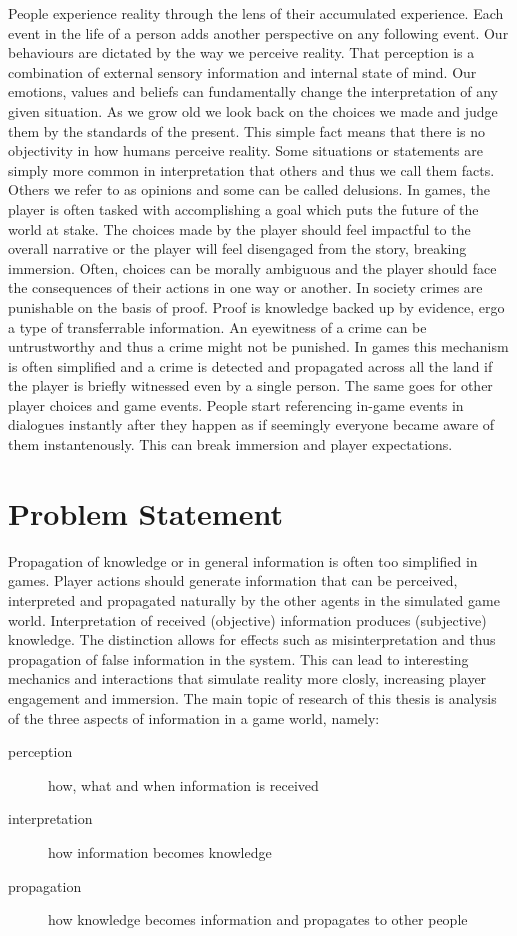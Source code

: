 People experience reality through the lens of their accumulated experience.
Each event in the life of a person adds another perspective on any following event.
Our behaviours are dictated by the way we perceive reality.
That perception is a combination of external sensory information and internal state of mind.
Our emotions, values and beliefs can fundamentally change the interpretation of any given situation.
As we grow old we look back on the choices we made and judge them by the standards of the present.
This simple fact means that there is no objectivity in how humans perceive reality.
Some situations or statements are simply more common in interpretation that others and thus we call them facts.
Others we refer to as opinions and some can be called delusions.
In games, the player is often tasked with accomplishing a goal which puts the future of the world at stake.
The choices made by the player should feel impactful to the overall narrative or the player will feel disengaged from the story, breaking immersion.
Often, choices can be morally ambiguous and the player should face the consequences of their actions in one way or another.
In society crimes are punishable on the basis of proof.
Proof is knowledge backed up by evidence, ergo a type of transferrable information.
An eyewitness of a crime can be untrustworthy and thus a crime might not be punished.
In games this mechanism is often simplified and a crime is detected and propagated across all the land if the player is briefly witnessed even by a single person.
The same goes for other player choices and game events.
People start referencing in-game events in dialogues instantly after they happen as if seemingly everyone became aware of them instantenously.
This can break immersion and player expectations.

\section{Problem Statement}
Propagation of knowledge or in general information is often too simplified in games.
Player actions should generate information that can be perceived, interpreted and propagated naturally by the other agents in the simulated game world.
Interpretation of received (objective) information produces (subjective) knowledge.
The distinction allows for effects such as misinterpretation and thus propagation of false information in the system.
This can lead to interesting mechanics and interactions that simulate reality more closly, increasing player engagement and immersion.
The main topic of research of this thesis is analysis of the three aspects of information in a game world, namely:
\begin{description}
    \item[perception] how, what and when information is received
    \item[interpretation] how information becomes knowledge
    \item[propagation] how knowledge becomes information and propagates to other people
\end{description}

